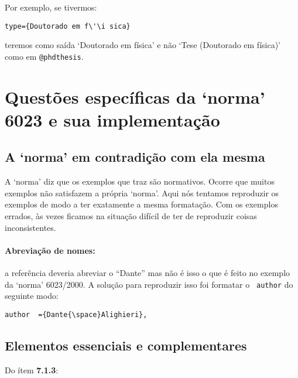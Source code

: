 \documentclass[a4paper]{ltxdoc}
\begin{document}
Por exemplo, se tivermos:

\begin{verbatim}
type={Doutorado em f\'\i sica}
\end{verbatim}

teremos como saída `Doutorado em física' e não `Tese (Doutorado em física)' como
em \texttt{@phdthesis}.




\appendix

\section{Questões específicas da `norma' 6023 e sua implementação}

\subsection{A `norma' em contradição com ela mesma}

A `norma' diz que os exemplos que traz são normativos. Ocorre que muitos
exemplos não satisfazem a própria `norma'. Aqui nós tentamos reproduzir os
exemplos de modo a ter exatamente a mesma formatação. Com os exemplos errados,
às vezes ficamos na situação difícil de ter de reproduzir coisas inconsistentes.

\paragraph{Abreviação de nomes:} a referência  deveria
abreviar o ``Dante'' mas não é isso o que é feito no exemplo da `norma'
6023/2000\cite{NBR6023:2000}. A solução para reproduzir isso foi formatar o \texttt{
author} do seguinte modo:

\begin{verbatim}
author  ={Dante{\space}Alighieri},
\end{verbatim}

\subsection{Elementos essenciais e complementares}

Do ítem \textbf{7.1.3}\cite{NBR6023:2000}:
\end{document}
